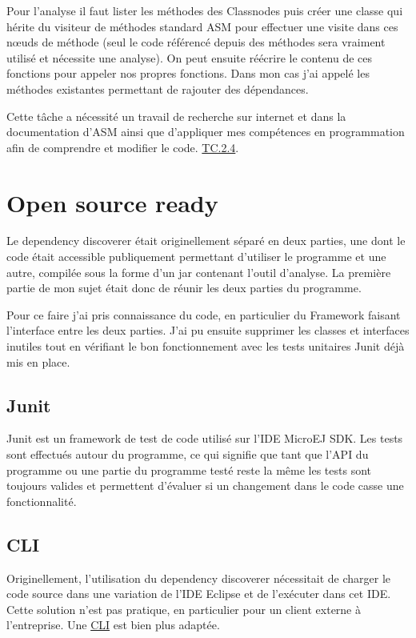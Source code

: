 \documentclass[french,a4paper,12pt]{report}
\begin{document}
\bigskip

Pour l'analyse il faut lister les méthodes des Classnodes puis créer une classe qui hérite du visiteur de méthodes standard ASM pour effectuer une visite dans ces nœuds de méthode (seul le code référencé depuis des méthodes sera vraiment utilisé et nécessite une analyse). On peut ensuite réécrire le contenu de ces fonctions pour appeler nos propres fonctions. Dans mon cas j'ai appelé les méthodes existantes permettant de rajouter des dépendances.   

Cette tâche a nécessité un travail de recherche sur internet et dans la documentation d’ASM ainsi que d’appliquer mes compétences en programmation afin de comprendre et modifier le code. \hyperlink{competences}{TC.2.4}.

\section{Open source ready}

Le dependency discoverer était originellement séparé en deux parties, une dont le code était accessible publiquement permettant d'utiliser le programme et une autre, compilée sous la forme d'un jar contenant l'outil d'analyse. La première partie de mon sujet était donc de réunir les deux parties du programme.

Pour ce faire j'ai pris connaissance du code, en particulier du Framework faisant l'interface entre les deux parties. J'ai pu ensuite supprimer les classes et interfaces inutiles tout en vérifiant le bon fonctionnement avec les tests unitaires Junit déjà mis en place.

\subsection{Junit}

Junit est un framework de test de code utilisé sur l’IDE MicroEJ SDK. Les tests sont effectués autour du programme, ce qui signifie que tant que l’API du programme ou une partie du programme testé reste la même les tests sont toujours valides et permettent d’évaluer si un changement dans le code casse une fonctionnalité.

\subsection{CLI}

Originellement, l'utilisation du dependency discoverer nécessitait de charger le code source dans une variation de l'IDE Eclipse et de l’exécuter dans cet IDE. Cette solution n'est pas pratique, en particulier pour un client externe à l'entreprise. Une \hyperlink{CLI}{CLI} est bien plus adaptée.
\end{document}
